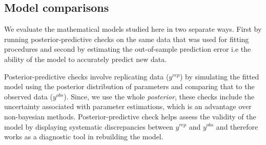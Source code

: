 \documentclass[11pt]{article}
\newcommand{\red}[1]{{\color{red}{#1}}}
\begin{document}
\subsection*{Model comparisons}

We evaluate the mathematical models studied here in two separate ways.
First by running posterior-predictive checks on the same data that was used for fitting procedures and second by estimating the out-of-sample prediction error i.e the ability of the model to accurately predict new data. 

Posterior-predictive checks involve replicating data ($y^{rep}$) by simulating the fitted model using the posterior distribution of parameters and comparing that to the observed data ($y^{obs}$).
Since, we use the whole \textit{posterior}, these checks include the uncertainty associated with parameter estimations, which is an advantage over non-bayesian methods.  
Posterior-predictive check helps assess the validity of the model by displaying systematic discrepancies between $y^{rep}$ and $y^{obs}$ and therefore works as a diagnostic tool in rebuilding the model.
\red{Its just a systematic way to ask whether your model makes sense in the light of observed data.}
\end{document}
